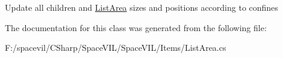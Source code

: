 Update all children and \mbox{\hyperlink{class_space_v_i_l_1_1_list_area}{List\+Area}} sizes and positions according to confines 



The documentation for this class was generated from the following file\+:\begin{DoxyCompactItemize}
\item 
F\+:/spacevil/\+C\+Sharp/\+Space\+V\+I\+L/\+Space\+V\+I\+L/\+Items/List\+Area.\+cs\end{DoxyCompactItemize}
